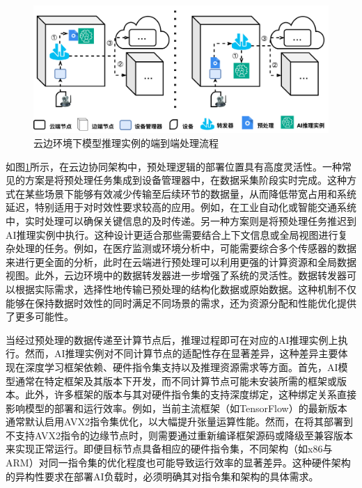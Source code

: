 \begin{figure}[ht]
  \centering
  \includegraphics[width=\linewidth]{pics/3-4AI负载.png}
  \caption{云边环境下模型推理实例的端到端处理流程}
  \label{fig:3-4aiload}
\end{figure}

如图\ref{fig:3-4aiload}所示，在云边协同架构中，预处理逻辑的部署位置具有高度灵活性。一种常见的方案是将预处理任务集成到设备管理器中，在数据采集阶段实时完成。这种方式在某些场景下能够有效减少传输至后续环节的数据量，从而降低带宽占用和系统延迟，特别适用于对时效性要求较高的应用。例如，在工业自动化或智能交通系统中，实时处理可以确保关键信息的及时传递。另一种方案则是将预处理任务推迟到AI推理实例中执行。这种设计更适合那些需要结合上下文信息或全局视图进行复杂处理的任务。例如，在医疗监测或环境分析中，可能需要综合多个传感器的数据来进行更全面的分析，此时在云端进行预处理可以利用更强的计算资源和全局数据视图。此外，云边环境中的数据转发器进一步增强了系统的灵活性。数据转发器可以根据实际需求，选择性地传输已预处理的结构化数据或原始数据。这种机制不仅能够在保持数据时效性的同时满足不同场景的需求，还为资源分配和性能优化提供了更多可能性。


当经过预处理的数据传递至计算节点后，推理过程即可在对应的AI推理实例上执行。然而，AI推理实例对不同计算节点的适配性存在显著差异，这种差异主要体现在深度学习框架依赖、硬件指令集支持以及推理资源需求等方面。首先，AI模型通常在特定框架及其版本下开发，而不同计算节点可能未安装所需的框架或版本。此外，许多框架的版本与其对硬件指令集的支持深度绑定，这种绑定关系直接影响模型的部署和运行效率。例如，当前主流框架（如TensorFlow）的最新版本通常默认启用AVX2指令集优化，以大幅提升张量运算性能。然而，在将其部署到不支持AVX2指令的边缘节点时，则需要通过重新编译框架源码或降级至兼容版本来实现正常运行。即便目标节点具备相应的硬件指令集，不同架构（如x86与ARM）对同一指令集的优化程度也可能导致运行效率的显著差异\cite{ren2019performance}。这种硬件架构的异构性要求在部署AI负载时，必须明确其对指令集和架构的具体需求。

